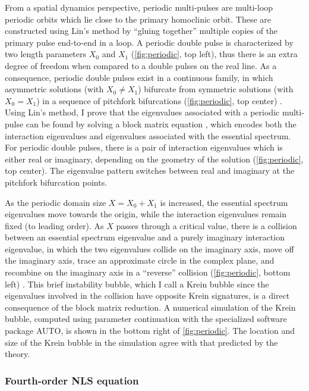 \documentclass[11pt,reqno,oneside]{article}
\theoremstyle{definition}
\theoremstyle{remark}
\begin{document}
From a spatial dynamics perspective, periodic multi-pulses are multi-loop periodic orbits which lie close to the primary homoclinic orbit. These are constructed using Lin's method by ``gluing together'' multiple copies of the primary pulse end-to-end in a loop. A periodic double pulse is characterized by two length parameters $X_0$ and $X_1$ (\cref{fig:periodic}, top left), thus there is an extra degree of freedom when compared to a double pulses on the real line. As a consequence, periodic double pulses exist in a continuous family, in which asymmetric solutions (with $X_0 \neq X_1$) bifurcate from symmetric solutions (with $X_0 = X_1$) in a sequence of pitchfork bifurcations (\cref{fig:periodic}, top center) \cite{ParkerKdV}. Using Lin's method, I prove that the eigenvalues associated with a periodic multi-pulse can be found by solving a block matrix equation \cite[Theorem 5.3]{ParkerKdV}, which encodes both the interaction eigenvalues and eigenvalues associated with the essential spectrum. For periodic double pulses, there is a pair of interaction eigenvalues which is either real or imaginary, depending on the geometry of the solution (\cref{fig:periodic}, top center). The eigenvalue pattern switches between real and imaginary at the pitchfork bifurcation points. 

As the periodic domain size $X = X_0 + X_1$ is increased, the essential spectrum eigenvalues move towards the origin, while the interaction eigenvalues remain fixed (to leading order).
As $X$ passes through a critical value, there is a collision between an essential spectrum eigenvalue and a purely imaginary interaction eigenvalue, in which the two eigenvalues collide on the imaginary axis, move off the imaginary axis, trace an approximate circle in the complex plane, and recombine on the imaginary axis in a ``reverse'' collision (\cref{fig:periodic}, bottom left) \cite[Theorem 5.10]{ParkerKdV}. This brief instability bubble, which I call a Krein bubble since the eigenvalues involved in the collision have opposite Krein signatures, is a direct consequence of the block matrix reduction. A numerical simulation of the Krein bubble, computed using parameter continuation with the specialized software package AUTO, is shown in the bottom right of \cref{fig:periodic}. The location and size of the Krein bubble in the simulation agree with that predicted by the theory.

\subsubsection*{Fourth-order NLS equation}
\end{document}
